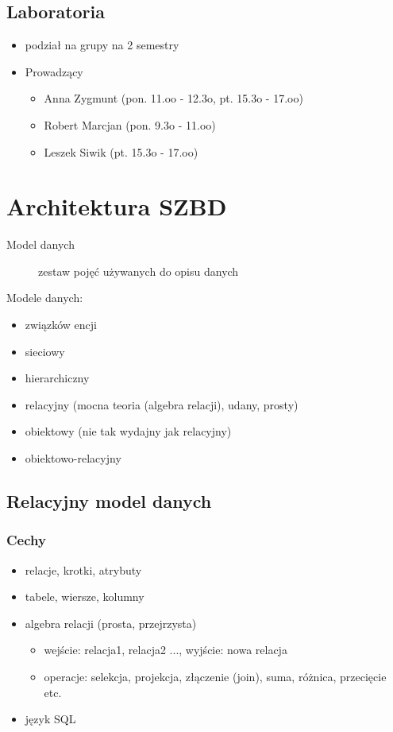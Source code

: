 \documentclass[12pt]{article}
\begin{document}
\subsection{Laboratoria}
\begin{itemize}
\item podział na grupy na 2 semestry
\item Prowadzący
\begin{itemize}
\item Anna Zygmunt (pon. 11.oo - 12.3o, pt. 15.3o - 17.oo)
\item Robert Marcjan (pon. 9.3o - 11.oo)
\item Leszek Siwik (pt. 15.3o - 17.oo)
\end{itemize}
\end{itemize}

\section{Architektura SZBD}

\begin{description}
\item[Model danych] zestaw pojęć używanych do opisu danych
\end{description}

Modele danych:
\begin{itemize}
\item związków encji
\item sieciowy
\item hierarchiczny
\item relacyjny (mocna teoria (algebra relacji), udany, prosty)
\item obiektowy (nie tak wydajny jak relacyjny)
\item obiektowo-relacyjny
\end{itemize}

\subsection{Relacyjny model danych}
\subsubsection{Cechy}

\begin{itemize}
\item relacje, krotki, atrybuty
\item tabele, wiersze, kolumny
\item algebra relacji (prosta, przejrzysta)
\begin{itemize}
\item wejście: relacja1, relacja2 ..., wyjście: nowa relacja
\item operacje: selekcja, projekcja, złączenie (join), suma, różnica, przecięcie etc.
\end{itemize}
\item język SQL
\end{itemize}
\end{document}

